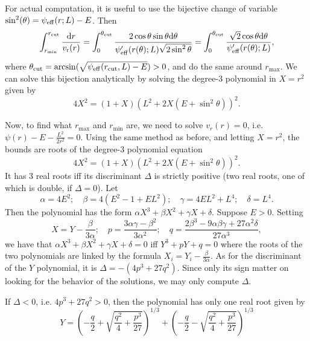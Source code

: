 \documentclass[11pt]{article}
\newcommand{\rr}{\mathrm{r}}
\newcommand{\vr}{v_{\rr}}
\newcommand{\rd}{{\rm{d}}}
\newcommand{\rmax}{r_{\max}}
\newcommand{\rmin}{r_{\min}}
\newcommand{\rcut}{r_{{\rm{cut}}}}
\newcommand{\tcut}{\theta_{{\rm{cut}}}}
\newcommand{\psieff}{\psi_{\rm{eff}}}
\begin{document}
For actual computation, it is useful to use the bijective change of variable $\sin^{2}(\theta) = \psieff(r;L)-E$. Then 
\begin{equation}
  \int_{\rmin}^{\rcut}\frac{{\rd}r}{\vr(r)}=\int_{0}^{\tcut}\frac{2\cos\theta\sin\theta{\rd}\theta}{\psieff'(r(\theta);L)\sqrt{2\sin^{2}\theta}}=\int_{0}^{\tcut}\frac{\sqrt{2}\cos\theta{\rd}\theta}{\psieff'(r(\theta);L)} ,
  \label{eq:change_variable_period}
\end{equation}
where $\tcut = \arcsin({\sqrt{\psieff(\rcut,L)-E}})>0$, and do the same around $\rmax$. We can solve this bijection analytically by solving the degree-3 polynomial in $X=r^{2}$ given by
\begin{equation}
4X^{2}=(1+X)(L^{2}+2X(E+\sin^{2}\theta))^{2} .
\label{eq:bijection_polynomial}
\end{equation}

Now, to find what $\rmax$ and $\rmin$ are, we need to
solve $v_{r}(r)=0$, i.e.  $\psi(r)-E-\frac{L^{2}}{2r^{2}}=0$. Using the same method as before, and letting $X=r^{2}$, the bounds are roots of the degree-3 polynomial equation
\begin{equation}
4X^{2}=(1+X)(L^{2}+2X(E+\sin^{2}\theta))^{2} .
\label{eq:bounds_polynomial}
\end{equation}
It has 3 real roots iff its
discriminant $\Delta$ is strictly positive (two real roots, one of
which is double, if $\Delta=0$).  Let
\begin{equation}
\alpha=4E^{2};\quad\beta=4(E^{2}-1+EL^{2});\quad\gamma=4EL^{2}+L^{4};\quad\delta=L^{4}.
\label{eq:coeff_poly_bound}
\end{equation}
Then the polynomial has the form $\alpha X^{3}+\beta X^{2}+\gamma X+\delta$.
Suppose $E>0$. Setting 
\begin{equation}
X=Y-\frac{\beta}{3\alpha};\quad p=\frac{3\alpha\gamma-\beta^{2}}{3\alpha^{2}};\quad q=\frac{2\beta^{3}-9\alpha\beta\gamma+27\alpha^{2}\delta}{27\alpha^{3}},
\label{eq:Change_poly_variable}
\end{equation}
we have that $\alpha X^{3}+\beta X^{2}+\gamma X+\delta=0$ iff $Y^{3}+pY+q=0$
where the roots of the two polynomials are linked by the formula $X_{i}=Y_{i}-\frac{\beta}{3\alpha}.$
As for the discriminant of the $Y$ polynomial, it is $\Delta=-(4p^{3}+27q^{2})$. Since only its sign matter on looking for the behavior of the solutions,
we may only compute $\Delta$.

If $\Delta<0$, i.e. $4p^{3}+27q^{2}>0$, then the polynomial has
only one real root given by
\begin{equation}
Y=\left(-\frac{q}{2}+\sqrt{\frac{q^{2}}{4}+\frac{p^{3}}{27}}\right)^{1/3}+\left(-\frac{q}{2}-\sqrt{\frac{q^{2}}{4}+\frac{p^{3}}{27}}\right)^{1/3}
\label{eq:Neg_discriminant}
\end{equation}
\end{document}
